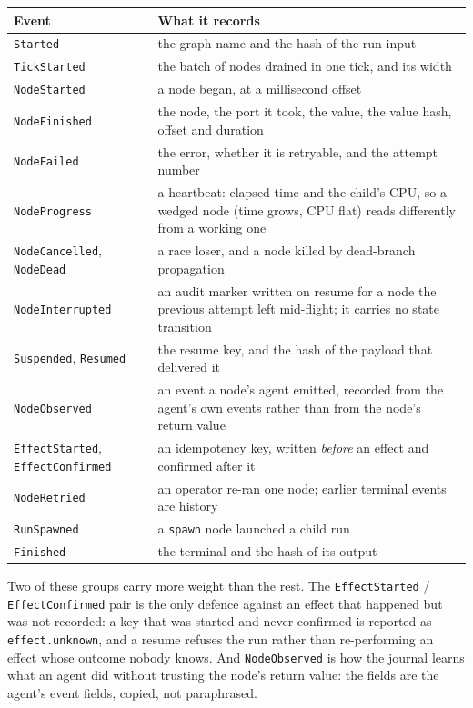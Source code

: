 \begin{longtable}{@{}p{}p{}@{}}
	\toprule
	\textbf{Event} & \textbf{What it records} \\
	\midrule
	\endhead
	\texttt{Started} & the graph name and the hash of the run input \\
	\texttt{TickStarted} & the batch of nodes drained in one tick, and its width \\
	\texttt{NodeStarted} & a node began, at a millisecond offset \\
	\texttt{NodeFinished} & the node, the port it took, the value, the value hash, offset and
	duration \\
	\texttt{NodeFailed} & the error, whether it is retryable, and the attempt number \\
	\texttt{NodeProgress} & a heartbeat: elapsed time and the child's CPU, so a wedged node (time
	grows, CPU flat) reads differently from a working one \\
	\texttt{NodeCancelled}, \texttt{NodeDead} & a race loser, and a node killed by dead-branch
	propagation \\
	\texttt{NodeInterrupted} & an audit marker written on resume for a node the previous attempt
	left mid-flight; it carries no state transition \\
	\texttt{Suspended}, \texttt{Resumed} & the resume key, and the hash of the payload that
	delivered it \\
	\texttt{NodeObserved} & an event a node's agent emitted, recorded from the agent's own events
	rather than from the node's return value \\
	\texttt{EffectStarted}, \texttt{EffectConfirmed} & an idempotency key, written \emph{before} an
	effect and confirmed after it \\
	\texttt{NodeRetried} & an operator re-ran one node; earlier terminal events are history \\
	\texttt{RunSpawned} & a \texttt{spawn} node launched a child run \\
	\texttt{Finished} & the terminal and the hash of its output \\
	\bottomrule
\end{longtable}

Two of these groups carry more weight than the rest. The \texttt{EffectStarted} /
\texttt{EffectConfirmed} pair is the only defence against an effect that happened but was not
recorded: a key that was started and never confirmed is reported as \texttt{effect.unknown}, and a
resume refuses the run rather than re-performing an effect whose outcome nobody knows. And
\texttt{NodeObserved} is how the journal learns what an agent did without trusting the node's return
value: the fields are the agent's event fields, copied, not paraphrased.

